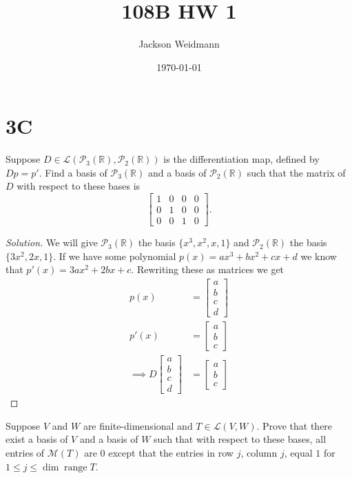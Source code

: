 \documentclass{article}
\title{108B HW 1}
\author{Jackson Weidmann}
\date{\today}
\newcommand{\LL}{\mathcal L}
\newcommand{\M}{\mathcal M}
\renewcommand{\P}{\mathcal P}
\newcommand{\R}{\mathbb R}
\DeclareMathOperator{\range}{range}
\newenvironment{problem}[2][Problem]{\begin{trivlist}
\item[\hskip \labelsep {\bfseries #1}\hskip \labelsep {\bfseries #2.}]}{\end{trivlist}}
\newenvironment{solution}
  {\renewcommand{\qedsymbol}{}\begin{proof}[Solution]}
  {\end{proof}}
\begin{document}
\maketitle
\section*{3C}
\begin{problem}{2}
Suppose $D\in\LL(\P_3(\R),\P_2(\R))$ is the differentiation map, defined by $Dp=p'$. Find a basis of $\P_3(\R)$ and a basis of $\P_2(\R)$ such that the matrix of $D$ with respect to these bases is
\[\begin{bmatrix} 1 & 0 & 0 & 0\\ 0 & 1 & 0 & 0\\0 & 0 & 1 & 0\end{bmatrix}.\]
\end{problem}
\begin{solution}
  We will give $\P_3(\R)$ the basis \ensuremath{\{x^3,x^2,x,1\}} and $\P_2(\R)$ the basis \ensuremath{\{3x^2,2x,1\}}. If we have some polynomial $p(x)=ax^3+bx^2+cx+d$ we know that $p'(x)=3ax^2+2bx+c$. Rewriting these as matrices we get
  \begin{align*}
    p(x)&=\begin{bmatrix} a\\b\\c\\d \end{bmatrix}\\
    p'(x)&=\begin{bmatrix} a\\b\\c \end{bmatrix}\\
    \implies D\begin{bmatrix} a\\b\\c\\d \end{bmatrix}&=\begin{bmatrix} a\\b\\c \end{bmatrix}
  \end{align*}
\end{solution}
\newpage
\begin{problem}{3}
Suppose $V$ and $W$ are finite-dimensional and $T\in\LL(V,W)$. Prove that there exist a basis of $V$ and a basis of $W$ such that with respect to these bases, all entries of $\M(T)$ are $0$ except that the entries in row $j$, column $j$, equal $1$ for $1\le j\le\dim\range T$.
\end{problem}
\end{document}
